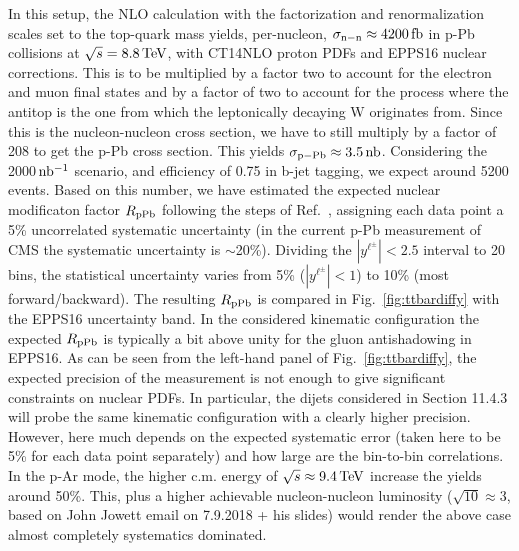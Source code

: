 \documentclass[../report.tex]{subfiles}
\begin{document}
In this setup, the NLO calculation with the factorization and renormalization scales set to the top-quark mass yields, per-nucleon, $\sigma_{\rm n-n} \approx 4200 \, {\rm fb}$ in p-Pb collisions at $\sqrt{s} = 8.8 \, {\rm TeV}$, with CT14NLO \cite{Dulat:2015mca} proton PDFs and EPPS16 \cite{Eskola:2016oht} nuclear corrections. This is to be multiplied by a factor two to account for the electron and muon final states and by a factor of two to account for the process where the antitop is the one from which the leptonically decaying W originates from. Since this is the nucleon-nucleon cross section, we have to still multiply by a factor of 208 to get the p-Pb cross section. This yields $\sigma_{\rm p-Pb} \approx 3.5 \, {\rm nb}$. Considering the 2000$\, \rm nb^{-1}$ scenario, and efficiency of 0.75 \cite{dEnterria:2015mgr} in b-jet tagging, we expect around 5200 events. Based on this number, we have estimated the expected nuclear modificaton factor $R_{\rm pPb}$ following the steps of Ref.~\cite{dEnterria:2015mgr}, assigning each data point a 5\% uncorrelated systematic uncertainty (in the current p-Pb measurement of CMS \cite{Sirunyan:2017xku} the systematic uncertainty is $\sim$20\%). Dividing the $|y^{\ell^\pm}| < 2.5$ interval to 20 bins, the statistical uncertainty varies from 5\% ($|y^{\ell^\pm}| < 1$) to 10\% (most forward/backward). The resulting $R_{\rm pPb}$ is compared in Fig.~\ref{fig:ttbardiffy} with the EPPS16 uncertainty band. In the considered kinematic configuration the expected $R_{\rm pPb}$ is typically a bit above unity for the gluon antishadowing in EPPS16. As can be seen from the left-hand panel of Fig.~\ref{fig:ttbardiffy}, the expected precision of the measurement is not enough to give significant constraints on nuclear PDFs. In particular, the dijets considered in Section 11.4.3 will probe the same kinematic configuration with a clearly higher precision. However, here much depends on the expected systematic error (taken here to be 5\% for each data point separately) and how large are the bin-to-bin correlations. In the p-Ar mode, the higher c.m. energy of $\sqrt{s} \approx 9.4 \, {\rm TeV}$ increase the yields around 50\%. This, plus a higher achievable nucleon-nucleon luminosity ($\sqrt{10} \approx 3$, based on John Jowett email on 7.9.2018 + his slides) would render the above case almost completely systematics dominated.
\end{document}
